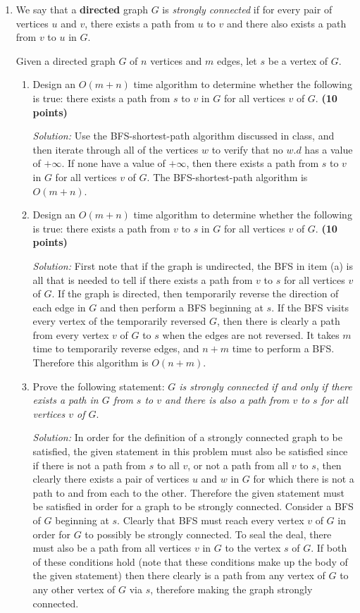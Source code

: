 \documentclass[11pt]{article}
\begin{document}
\begin{enumerate}
\item

We say that a {\bf directed} graph $G$ is {\em strongly connected} if for every pair of vertices $u$ and $v$, there exists a path from $u$ to $v$ and there also exists a path from $v$ to $u$ in $G$.

Given a directed graph $G$ of $n$ vertices and $m$ edges, let $s$ be a vertex of $G$.

\begin{enumerate}
\item
Design an $O(m+n)$ time algorithm to determine whether the following is true: there exists a path from $s$ to $v$ in $G$ for all vertices $v$ of $G$. {\hfill \bf (10 points)}

\textit{Solution:} Use the BFS-shortest-path algorithm discussed in class, and then iterate through all of the vertices $w$ to verify that no $w.d$ has a value of $+\infty$. If none have a value of $+\infty$, then there exists a path from $s$ to $v$ in $G$ for all vertices $v$ of $G$. The BFS-shortest-path algorithm is $O(m + n)$. 

\item
Design an $O(m+n)$ time algorithm to determine whether the following is true: there exists a path from $v$ to $s$ in $G$ for all vertices $v$ of $G$. {\hfill \bf (10 points)}

\textit{Solution:} First note that if the graph is undirected, the BFS in item (a) is all that is needed to tell if there exists a path from $v$ to $s$ for all vertices $v$ of $G$. If the graph is directed, then temporarily reverse the direction of each edge in $G$ and then perform a BFS beginning at $s$. If the BFS visits every vertex of the temporarily reversed $G$, then there is clearly a path from every vertex $v$ of $G$ to $s$ when the edges are not reversed. It takes $m$ time to temporarily reverse edges, and $n+m$ time to perform a BFS. Therefore this algorithm is $O(n+m)$.

\item
Prove the following statement: {\em $G$ is strongly connected if and only if there exists a path in $G$ from $s$ to $v$ and there is also a path from $v$ to $s$  for all vertices $v$ of $G$}.

\textit{Solution:} In order for the definition of a strongly connected graph to be satisfied, the given statement in this problem must also be satisfied since if there is not a path from $s$ to all $v$, or not a path from all $v$ to $s$, then clearly there exists a pair of vertices $u$ and $w$ in $G$ for which there is not a path to and from each to the other. Therefore the given statement must be satisfied in order for a graph to be strongly connected. Consider a BFS of $G$ beginning at $s$. Clearly that BFS must reach every vertex $v$ of $G$ in order for $G$ to possibly be strongly connected. To seal the deal, there must also be a path from all vertices $v$ in $G$ to the vertex $s$ of $G$. If both of these conditions hold (note that these conditions make up the body of the given statement) then there clearly is a path from any vertex of $G$ to any other vertex of $G$ via $s$, therefore making the graph strongly connected.


\end{enumerate}
\end{enumerate}
\end{document}

